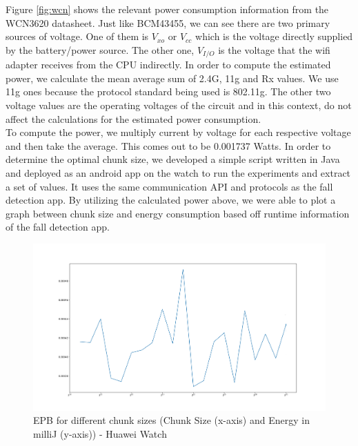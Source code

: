 Figure \ref{fig:wcn} shows the relevant power consumption information from the WCN3620 datasheet. Just like BCM43455, we can see there 
are two primary sources of voltage. One of them is $V_{xo}$ or $V_{cc}$ which is the voltage directly supplied by the battery/power source. 
The other one, $V_{I/O}$ is the voltage that the wifi adapter receives from the CPU indirectly. In order to compute the estimated power, 
we calculate the mean average sum of 2.4G, 11g and Rx values. We use 11g ones because the protocol standard being used is 802.11g. The other 
two voltage values are the operating voltages of the circuit and in this context, do not affect the calculations for the estimated 
power consumption. \\
To compute the power, we multiply current by voltage for each respective voltage and then take the average. This comes out to be 0.001737 Watts. 
In order to determine the optimal chunk size, we developed a simple script written in Java and deployed as an android app on the watch to 
run the experiments and extract a set of values. It uses the same communication API and protocols as the fall detection app. By utilizing the 
calculated power above, we were able to plot a graph between chunk size and energy consumption based off runtime information of the fall detection app.

\begin{figure}
    \begin{center}
        \includegraphics[scale=0.35]{Figs/energyandroid.png}    
    \end{center}
    \caption{EPB for different chunk sizes (Chunk Size (x-axis) and Energy in milliJ (y-axis)) - Huawei Watch}
    \label{fig:energyand}
\end{figure}

